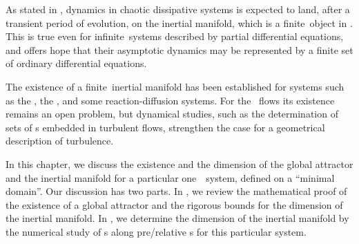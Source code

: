 

As stated in ,
dynamics in chaotic dissipative systems is expected to land, after a
transient period of evolution, on the inertial
manifold,
which is a finite\dmn\ object in \statesp. 
This is true even for infinite\dmn\ systems described by partial
differential equations, and offers hope that their asymptotic dynamics
may be represented by a finite set of ordinary differential equations.

The existence of a finite\dmn\
inertial manifold has been established for systems such as the
\KS, the \cGL, and some reaction-diffusion
systems. For the \NS\ flows its
existence remains an open problem,
but dynamical studies, such as the determination of sets of \po s embedded in
turbulent flows\rf{GHCW07,WiShCv15}, strengthen the case for a geometrical
description of turbulence.

In this chapter, we discuss the existence and the dimension
of the global attractor and
the inertial manifold for a particular one\dmn\ \KS\ system,
defined on a ``minimal domain''.
Our discussion has two parts. In ,
we review the mathematical proof of the existence of a global attractor and
the rigorous bounds for the dimension of the inertial manifold.
In , we determine the dimension of the inertial manifold
by the numerical study of \Fv s along pre/relative \po s for this particular system.
